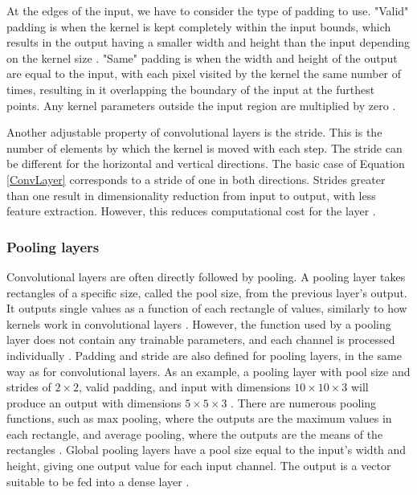 \documentclass[12pt]{article}
\begin{document}
At the edges of the input, we have to consider the type of padding to use. "Valid" padding is when the kernel is kept completely within the input bounds, which results in the output having a smaller width and height than the input depending on the kernel size \cite{Aghdam17, Goodfellow16}. "Same" padding is when the width and height of the output are equal to the input, with each pixel visited by the kernel the same number of times, resulting in it overlapping the boundary of the input at the furthest points. Any kernel parameters outside the input region are multiplied by zero \cite{Aghdam17, Goodfellow16}.

Another adjustable property of convolutional layers is the stride. This is the number of elements by which the kernel is moved with each step. The stride can be different for the horizontal and vertical directions. The basic case of Equation \ref{ConvLayer} corresponds to a stride of one in both directions. Strides greater than one result in dimensionality reduction from input to output, with less feature extraction. However, this reduces computational cost for the layer \cite{Aghdam17, Goodfellow16}.

\subsubsection{Pooling layers}
Convolutional layers are often directly followed by pooling. A pooling layer takes rectangles of a specific size, called the pool size, from the previous layer's output. It outputs single values as a function of each rectangle of values, similarly to how kernels work in convolutional layers \cite{Aghdam17, Goodfellow16}. However, the function used by a pooling layer does not contain any trainable parameters, and each channel is processed individually \cite{Aghdam17, Goodfellow16}. Padding and stride are also defined for pooling layers, in the same way as for convolutional layers. As an example, a pooling layer with pool size and strides of $2 \times 2$, valid padding, and input with dimensions $10 \times 10 \times 3$ will produce an output with dimensions $5 \times 5 \times 3$ \cite{Aghdam17, Goodfellow16}. There are numerous pooling functions, such as max pooling, where the outputs are the maximum values in each rectangle, and average pooling, where the outputs are the means of the rectangles \cite{Goodfellow16}. Global pooling layers have a pool size equal to the input's width and height, giving one output value for each input channel. The output is a vector suitable to be fed into a dense layer \cite{Aghdam17}.
\end{document}
